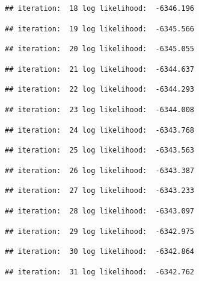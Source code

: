 \documentclass[
]{article}
\begin{document}
\begin{verbatim}
## iteration:  18 log likelihood:  -6346.196
\end{verbatim}

\begin{verbatim}
## iteration:  19 log likelihood:  -6345.566
\end{verbatim}

\begin{verbatim}
## iteration:  20 log likelihood:  -6345.055
\end{verbatim}

\begin{verbatim}
## iteration:  21 log likelihood:  -6344.637
\end{verbatim}

\begin{verbatim}
## iteration:  22 log likelihood:  -6344.293
\end{verbatim}

\begin{verbatim}
## iteration:  23 log likelihood:  -6344.008
\end{verbatim}

\begin{verbatim}
## iteration:  24 log likelihood:  -6343.768
\end{verbatim}

\begin{verbatim}
## iteration:  25 log likelihood:  -6343.563
\end{verbatim}

\begin{verbatim}
## iteration:  26 log likelihood:  -6343.387
\end{verbatim}

\begin{verbatim}
## iteration:  27 log likelihood:  -6343.233
\end{verbatim}

\begin{verbatim}
## iteration:  28 log likelihood:  -6343.097
\end{verbatim}

\begin{verbatim}
## iteration:  29 log likelihood:  -6342.975
\end{verbatim}

\begin{verbatim}
## iteration:  30 log likelihood:  -6342.864
\end{verbatim}

\begin{verbatim}
## iteration:  31 log likelihood:  -6342.762
\end{verbatim}
\end{document}
